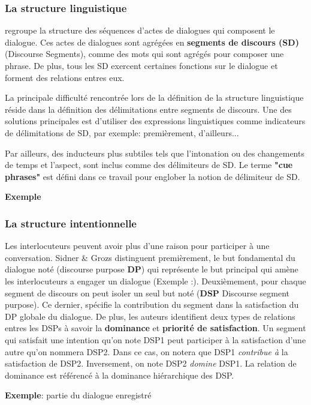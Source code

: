 \documentclass[a4paper,french]{article}
\begin{document}
\subsubsection{La structure linguistique} regroupe la structure des séquences d'actes de dialogues qui composent le dialogue. Ces actes de dialogues sont agrégées en \textbf{segments de discours (SD)} (Discourse Segments), comme des mots qui sont agrégés pour composer une phrase. De plus, tous les SD exercent certaines fonctions sur le dialogue et forment des relations entres eux.  
\par La principale difficulté rencontrée lors de la définition de la structure linguistique réside dans la définition des délimitations entre segments de discours. Une des solutions principales est d'utiliser des expressions linguistiques comme indicateurs de délimitations de SD, par exemple: premièrement, d'ailleurs... 
\par Par ailleurs, des inducteurs plus subtiles tels que l'intonation ou des changements de temps et l'aspect, sont inclus comme des délimiteurs de SD. Le terme \textbf{"cue phrases"} est défini dans ce travail pour englober la notion de délimiteur de SD. 

\textbf{Exemple}

\subsubsection{La structure intentionnelle} 
Les interlocuteurs peuvent avoir plus d'une raison pour participer à une conversation. Sidner \& Grozs distinguent premièrement, le but fondamental du dialogue noté (discourse purpose \textbf{DP}) qui représente le but principal qui amène les interlocuteurs a engager un dialogue (Exemple :). Deuxièmement, pour chaque segment de discours on peut isoler un seul but noté (\textbf{DSP} Discourse segment purpose). Ce dernier, spécifie la contribution du segment dans la satisfaction du DP globale du dialogue. De plus, les auteurs identifient deux types de relations entres les DSPs à savoir la \textbf{dominance} et \textbf{priorité de satisfaction}. Un segment qui satisfait une intention qu'on note DSP1 peut participer à la satisfaction d'une autre qu'on nommera DSP2. Dans ce cas, on notera que DSP1 \textit{contribue à} la satisfaction de DSP2. Inversement, on note DSP2 \textit{domine} DSP1. La relation de dominance est référencé à la dominance hiérarchique des DSP.

\par \textbf{Exemple}: 
partie du dialogue enregistré
\end{document}
